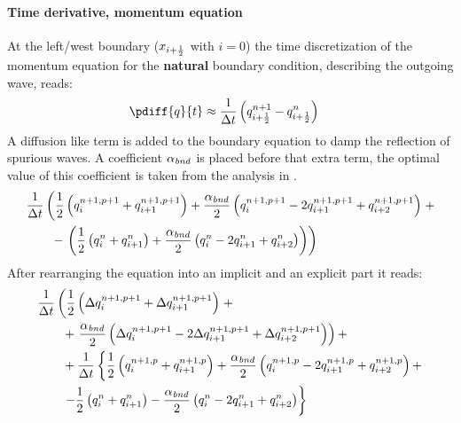 \paragraph*{Time derivative, momentum equation}
At the left/west boundary ($x_{i+\frac{1}{2}}$ with $i=0$) the time discretization of the momentum equation for the \textbf{natural} boundary condition, describing the outgoing wave, reads:
\begin{align}
    \pdiff{q}{t} & \approx \frac{1}{\Dt} \left(  q^{n+1}_{i+\half} - q^{n}_{i+\half} \right)
\end{align}
A diffusion like term is added to the boundary equation to damp the reflection of spurious waves.
A coefficient $\alpha_{\it bnd}$ is placed before that extra term, the optimal value of this coefficient is taken from the analysis in \citet{JanMooiman2025}.
\begin{align}
    & \frac{1}{\Delta t}\left( \frac{1}{2} \left( q^{n+1,p+1}_{i} + q^{n+1,p+1}_{i+1} \right)
    + \frac{\alpha_{\it bnd}}{2} \left( q^{n+1,p+1}_{i} - 2 q^{n+1,p+1}_{i+1} + q^{n+1,p+1}_{i+2}  \right) \right. +
    \nonumber \\*
    & \qquad  - \left. \left(
    \frac{1}{2} \left( q^{n}_{i} + q^{n}_{i+1} \right)
    + \frac{\alpha_{\it bnd}}{2}  \left( q^{n}_{i} - 2 q^{n}_{i+1} + q^{n}_{i+2}  \right) \right)
    \right)
\end{align}
After rearranging the equation into an implicit and an explicit part it reads:
\begin{align}
    & \frac{1}{\Delta t}  \left( \frac{1}{2} \left( \Delta q^{n+1, p+1}_{i} + \Delta q^{n+1, p+1}_{i+1} \right) \right. +
    \nonumber \\*
    & \qquad + \left. \frac{\alpha_{\it bnd}}{2}\left( \Delta q^{n+1,p+1}_{i} - 2 \Delta q^{n+1,p+1}_{i+1} + \Delta q^{n+1,p+1}_{i+2} \right) \right) +
    \nonumber \\
    & \qquad +  \frac{1}{\Delta t} \left\{ \frac{1}{2} \left( q^{n+1, p}_{i} + q^{n+1, p}_{i+1} \right) + \frac{\alpha_{\it bnd}}{2}\left( q^{n+1,p}_{i} - 2 q^{n+1,p}_{i+1}  + q^{n+1,p}_{i+2} \right) + \right.
    \nonumber \\*
    & \qquad
    \left.  - \frac{1}{2} \left( q^{n}_{i} + q^{n}_{i+1} \right) - \frac{\alpha_{\it bnd}}{2} \left( q^{n}_{i} - 2 q^{n}_{i+1} + q^{n}_{i+2}  \right) \right\}
\end{align}

